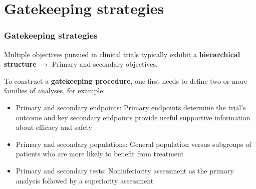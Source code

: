 \documentclass[xcolor={dvipsnames}]{beamer}
\newcommand{\rbf}[1]{\textcolor{redUnipd}{ #1}}
\begin{document}
\begin{frame}
\begin{center}
\end{center}
\end{frame}

\section{Gatekeeping strategies}

\begin{frame}
\frametitle{Gatekeeping strategies}
Multiple objectives pursued in clinical trials typically exhibit a \textbf{hierarchical structure} $\rightarrow$ Primary and secondary objectives.

\bigskip

To construct a \textbf{gatekeeping procedure}, one first needs to define two or
more families of analyses, for example:
\begin{itemize}
    \item \rbf{Primary and secondary endpoints}: Primary endpoints determine the trial's outcome and key secondary endpoints provide useful supportive information about efficacy and safety
    \item \rbf{Primary and secondary populations}: General population versus subgroups of patients who are more likely to benefit from treatment
    \item \rbf{Primary and secondary tests}: Noninferiority assessment as the primary analysis followed by a superiority assessment
\end{itemize}


\end{frame}
\end{document}
